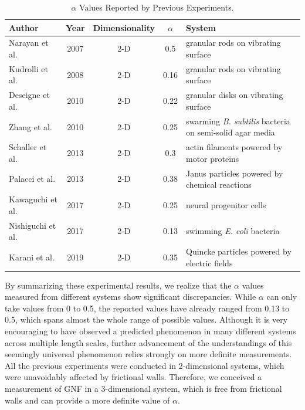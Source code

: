 \begin{table}[h]
	\centering
	\begin{tabular}{  lccc m{2in} }
		\toprule
		Author              & Year & Dimensionality & $\alpha$ & System \\\midrule
		Narayan et al.      & 2007 & 2-D            &  0.5     & granular rods on vibrating surface \\
		Kudrolli et al.     & 2008 & 2-D            &  0.16    & granular rods on vibrating surface \\
		Deseigne et al.     & 2010 & 2-D            &  0.22    & granular disks on vibrating surface \\
		Zhang et al.        & 2010 & 2-D            &  0.25    & swarming \textit{B. subtilis} bacteria on semi-solid agar media \\
		Schaller et al.     & 2013 & 2-D            &  0.3     & actin filaments powered by motor proteins \\
		Palacci et al.      & 2013 & 2-D            &  0.38    & Janus particles powered by chemical reactions \\
		Kawaguchi et al.    & 2017 & 2-D            &  0.25    & neural progenitor cells \\
		Nishiguchi et al.   & 2017 & 2-D            &  0.13    & swimming \textit{E. coli} bacteria \\
		Karani et al.       & 2019 & 2-D            &  0.35    & Quincke particles powered by electric fields \\
		\bottomrule
	\end{tabular}
	\caption{$\alpha$ Values Reported by Previous Experiments.}
	\label{table:alpha-values}
\end{table}

By summarizing these experimental results, we realize that the $\alpha$ values measured from different systems show significant discrepancies. While $\alpha$ can only take values from 0 to 0.5, the reported values have already ranged from 0.13 to 0.5, which spans almost the whole range of possible values.
Although it is very encouraging to have observed a predicted phenomenon in many different systems across multiple length scales, further advancement of the understandings of this seemingly universal phenomenon relies strongly on more definite measurements. All the previous experiments were conducted in 2-dimensional systems, which were unavoidably affected by frictional walls. Therefore, we conceived a measurement of GNF in a 3-dimensional system, which is free from frictional walls and can provide a more definite value of $\alpha$.

